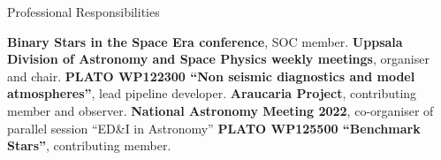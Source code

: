 \begin{rubric}{Professional Responsibilities}

\entry*[2025 ~~~~~\,\,\,\,\,~~~~~]%
    \textbf{Binary Stars in the Space Era conference}, SOC member.
\entry*[2024 -- ~~~~~\,\,\,~~~]%
    \textbf{Uppsala Division of Astronomy and Space Physics weekly meetings}, organiser and chair.
\entry*[2024 -- ~~~~~\,\,\,~~~]%
    \textbf{PLATO WP122300 ``Non seismic diagnostics and model atmospheres''}, lead pipeline developer.
\entry*[2023 -- 2024]%
    \textbf{Araucaria Project}, contributing member and observer.
\entry*[2022 ~~~~~\,\,\,\,\,~~~~~]%
    \textbf{National Astronomy Meeting 2022}, co-organiser of parallel session ``ED\&I in Astronomy''
\entry*[2019 -- ~~~~~\,\,\,~~~]%
    \textbf{PLATO WP125500 ``Benchmark Stars''}, contributing member.
%
% 






\end{rubric}
